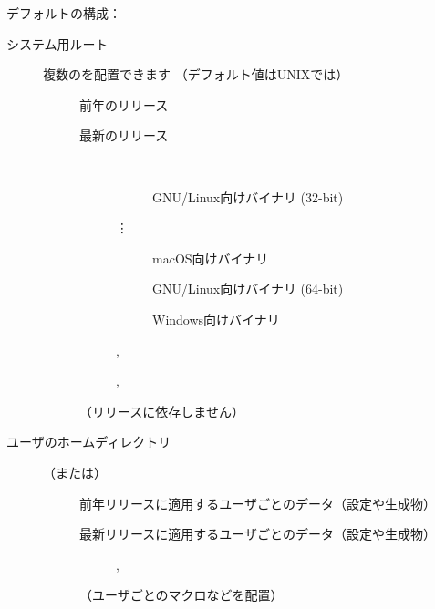 \documentclass[uplatex,dvipdfmx,tombow]{jsarticle}
\begin{document}
\noindent
デフォルトの\TL 構成：
%
\begin{description}
\item[システム用ルート] 複数の\TL を配置できます
  （デフォルト値はUNIXでは）
  \begin{description}
  \item[] 前年のリリース
  \item[] 最新のリリース
    \begin{description}
    \item[] ~
      \begin{description}
      \item[] GNU/Linux向けバイナリ (32-bit)
      \item[\quad\vdots]
      \item[] macOS向けバイナリ
      \item[] GNU/Linux向けバイナリ (64-bit)
      \item[] Windows向けバイナリ
      \end{description}
    \item[] , 
    \item[] , 
    \item[] 
    \end{description}
  \item[] （リリースに依存しません）
  \end{description}
\item[ユーザのホームディレクトリ] （または）
  \begin{description}
  \item[] 前年リリースに適用するユーザごとのデータ（設定や生成物）
  \item[] 最新リリースに適用するユーザごとのデータ（設定や生成物）
    \begin{description}
    \item[] , 
    \item[] 
    \end{description}
  \item[] （ユーザごとのマクロなどを配置）
  \end{description}
\end{description}
\end{document}
